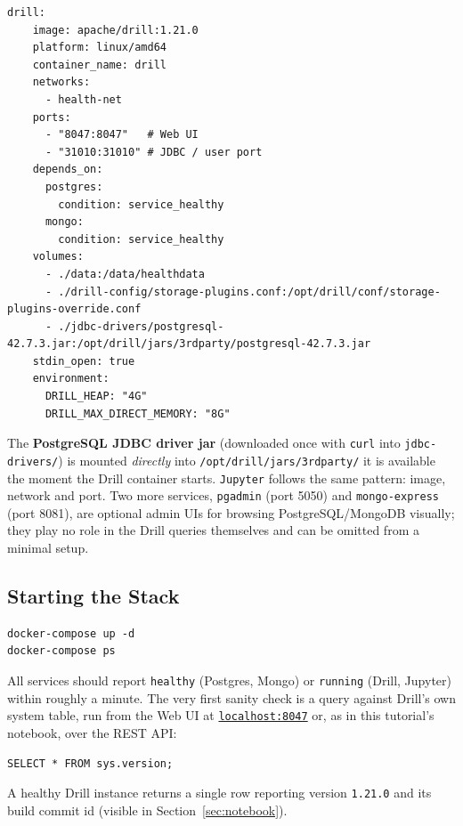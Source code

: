 \documentclass[11pt,a4paper]{article}
\begin{document}
\begin{lstlisting}[style=yamlstyle, caption={Drill service: it depends on Postgres and MongoDB being healthy first, mounts the data directory, the storage-plugin override file, and  the PostgreSQL JDBC driver.}]
drill:
    image: apache/drill:1.21.0
    platform: linux/amd64
    container_name: drill
    networks:
      - health-net
    ports:
      - "8047:8047"   # Web UI
      - "31010:31010" # JDBC / user port
    depends_on:
      postgres:
        condition: service_healthy
      mongo:
        condition: service_healthy
    volumes:
      - ./data:/data/healthdata
      - ./drill-config/storage-plugins.conf:/opt/drill/conf/storage-plugins-override.conf
      - ./jdbc-drivers/postgresql-42.7.3.jar:/opt/drill/jars/3rdparty/postgresql-42.7.3.jar
    stdin_open: true
    environment:
      DRILL_HEAP: "4G"
      DRILL_MAX_DIRECT_MEMORY: "8G"
\end{lstlisting}



The \textbf{PostgreSQL JDBC driver jar} (downloaded once with \texttt{curl} into
\texttt{jdbc-drivers/}) is mounted \emph{directly} into
\texttt{/opt/drill/jars/3rdparty/}  it is available the moment the Drill
container starts. \texttt{Jupyter} follows the same pattern: image,
network and port.
Two more services, \texttt{pgadmin} (port 5050) and \texttt{mongo-express} (port
8081), are optional admin UIs for browsing PostgreSQL/MongoDB visually; they play no
role in the Drill queries themselves and can be omitted from a minimal setup.

\subsection{Starting the Stack}
\begin{lstlisting}[style=bashstyle]
docker-compose up -d
docker-compose ps
\end{lstlisting}
All services should report \texttt{healthy} (Postgres, Mongo) or \texttt{running}
(Drill, Jupyter) within roughly a minute. The very first sanity check is a query
against Drill's own system table, run from the Web UI at
\href{http://localhost:8047}{\texttt{localhost:8047}} or, as in this tutorial's
notebook, over the REST API:
\begin{lstlisting}[style=sqlstyle]
SELECT * FROM sys.version;
\end{lstlisting}
A healthy Drill instance returns a single row reporting version \texttt{1.21.0} and
its build commit id (visible in Section~\ref{sec:notebook}).
\end{document}
